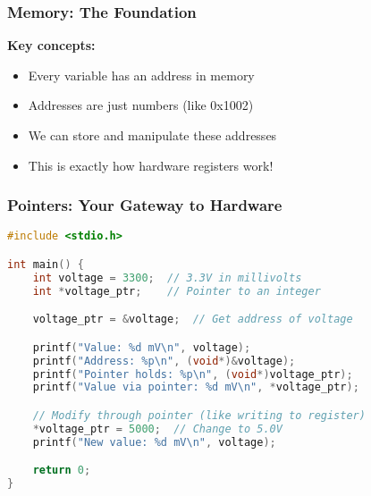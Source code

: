 \documentclass{beamer}
\begin{document}
\begin{frame}
\frametitle{Memory: The Foundation}
\begin{center}
\end{center}

\textbf{Key concepts:}
\begin{itemize}
    \item Every variable has an address in memory
    \item Addresses are just numbers (like 0x1002)
    \item We can store and manipulate these addresses
    \item This is exactly how hardware registers work!
\end{itemize}
\end{frame}

\begin{frame}[fragile]
\frametitle{Pointers: Your Gateway to Hardware}
\begin{lstlisting}[language=C, basicstyle=\fontsize{6}{6}\selectfont\ttfamily]
#include <stdio.h>

int main() {
    int voltage = 3300;  // 3.3V in millivolts
    int *voltage_ptr;    // Pointer to an integer

    voltage_ptr = &voltage;  // Get address of voltage

    printf("Value: %d mV\n", voltage);
    printf("Address: %p\n", (void*)&voltage);
    printf("Pointer holds: %p\n", (void*)voltage_ptr);
    printf("Value via pointer: %d mV\n", *voltage_ptr);

    // Modify through pointer (like writing to register)
    *voltage_ptr = 5000;  // Change to 5.0V
    printf("New value: %d mV\n", voltage);

    return 0;
}
\end{lstlisting}
\end{frame}
\end{document}

